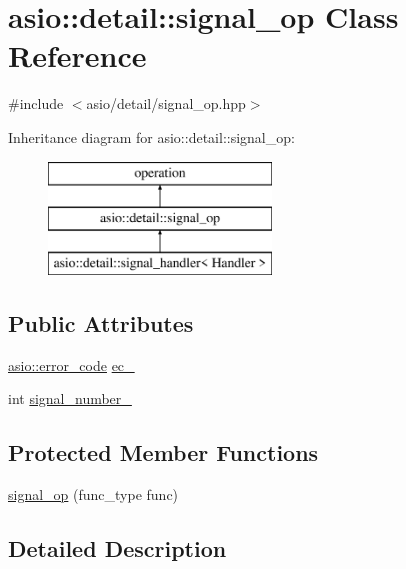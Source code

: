 \hypertarget{classasio_1_1detail_1_1signal__op}{}\section{asio\+:\+:detail\+:\+:signal\+\_\+op Class Reference}
\label{classasio_1_1detail_1_1signal__op}


{\ttfamily \#include $<$asio/detail/signal\+\_\+op.\+hpp$>$}

Inheritance diagram for asio\+:\+:detail\+:\+:signal\+\_\+op\+:\begin{figure}[H]
\begin{center}
\leavevmode
\includegraphics[height=3.000000cm]{classasio_1_1detail_1_1signal__op}
\end{center}
\end{figure}
\subsection*{Public Attributes}
\begin{DoxyCompactItemize}
\item 
\hyperlink{classasio_1_1error__code}{asio\+::error\+\_\+code} \hyperlink{classasio_1_1detail_1_1signal__op_a1eeb53c276a6a007cb74012a92fafeec}{ec\+\_\+}
\item 
int \hyperlink{classasio_1_1detail_1_1signal__op_a3ca07d986aeb62051c9c4af5104a2dff}{signal\+\_\+number\+\_\+}
\end{DoxyCompactItemize}
\subsection*{Protected Member Functions}
\begin{DoxyCompactItemize}
\item 
\hyperlink{classasio_1_1detail_1_1signal__op_a320d958f661b8bff2a4a9ed8165011c2}{signal\+\_\+op} (func\+\_\+type func)
\end{DoxyCompactItemize}


\subsection{Detailed Description}


